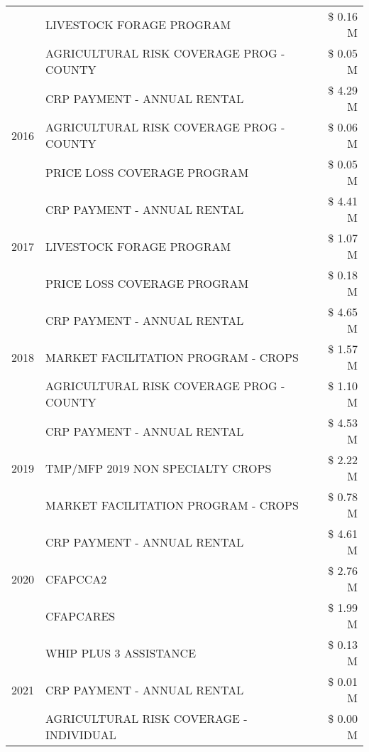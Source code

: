 \begin{tabular}{llr}
 & LIVESTOCK FORAGE PROGRAM & \$ 0.16 M \\
 & AGRICULTURAL RISK COVERAGE PROG - COUNTY & \$ 0.05 M \\
\cline{1-3}
\multirow[t]{3}{*}{2016} & CRP PAYMENT - ANNUAL RENTAL & \$ 4.29 M \\
 & AGRICULTURAL RISK COVERAGE PROG - COUNTY & \$ 0.06 M \\
 & PRICE LOSS COVERAGE PROGRAM & \$ 0.05 M \\
\cline{1-3}
\multirow[t]{3}{*}{2017} & CRP PAYMENT - ANNUAL RENTAL & \$ 4.41 M \\
 & LIVESTOCK FORAGE PROGRAM & \$ 1.07 M \\
 & PRICE LOSS COVERAGE PROGRAM & \$ 0.18 M \\
\cline{1-3}
\multirow[t]{3}{*}{2018} & CRP PAYMENT - ANNUAL RENTAL & \$ 4.65 M \\
 & MARKET FACILITATION PROGRAM - CROPS & \$ 1.57 M \\
 & AGRICULTURAL RISK COVERAGE PROG - COUNTY & \$ 1.10 M \\
\cline{1-3}
\multirow[t]{3}{*}{2019} & CRP PAYMENT - ANNUAL RENTAL & \$ 4.53 M \\
 & TMP/MFP 2019 NON SPECIALTY CROPS & \$ 2.22 M \\
 & MARKET FACILITATION PROGRAM - CROPS & \$ 0.78 M \\
\cline{1-3}
\multirow[t]{3}{*}{2020} & CRP PAYMENT - ANNUAL RENTAL & \$ 4.61 M \\
 & CFAPCCA2 & \$ 2.76 M \\
 & CFAPCARES & \$ 1.99 M \\
\cline{1-3}
\multirow[t]{3}{*}{2021} & WHIP PLUS 3 ASSISTANCE & \$ 0.13 M \\
 & CRP PAYMENT - ANNUAL RENTAL & \$ 0.01 M \\
 & AGRICULTURAL RISK COVERAGE - INDIVIDUAL & \$ 0.00 M \\
\cline{1-3}
\bottomrule
\end{tabular}
